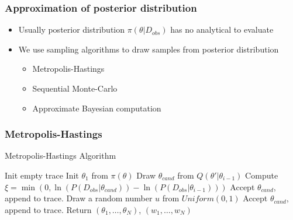 \documentclass{beamer}
\begin{document}
\begin{frame}
    \frametitle{Approximation of  posterior distribution}
    \begin{itemize}
        \item Usually posterior distribution $\pi(\theta|D_{obs})$ has no analytical to evaluate
        \item We use sampling algorithms to draw samples from posterior distribution
              \begin{itemize}
                  \item Metropolis-Hastings
                  \item Sequential Monte-Carlo
                  \item Approximate Bayesian computation
              \end{itemize}
    \end{itemize}
\end{frame}

\begin{frame}
    \frametitle{Metropolis-Hastings}
    \footnotesize{
        \begin{algorithm}[H]
            \caption{Metropolis-Hastings Algorithm}
            \label{alg:mh}
            \begin{algorithmic}[1]
                \State Init empty trace
                \State Init $\theta_{1}$ from $\pi(\theta)$
                \State Draw $\theta_{cand}$ from $Q(\theta'|\theta_{i-1})$
                \State Compute $\xi = \min(0, \ln(P(D_{obs}|\theta_{cand})) - \ln(P(D_{obs}|\theta_{i-1})))$
                \State Accept $\theta_{cand}$, append to trace.
                \Else
                \State Draw a random number $u$ from $Uniform(0,1)$
                \State Accept $\theta_{cand}$, append to trace.
                \EndIf
                \EndIf
                \EndWhile
                \State Return $(\theta_1,\ldots,\theta_{N})$, $(w_1,\ldots,w_{N})$
                \EndProcedure
            \end{algorithmic}
        \end{algorithm}
    }
\end{frame}
\end{document}

